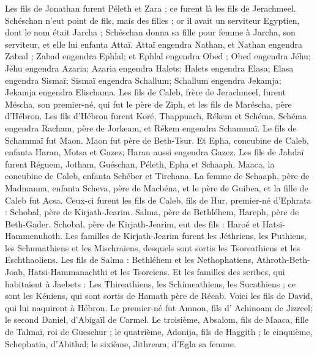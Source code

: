 \begin{multicols}{2}
Les fils de Jonathan furent Péleth et Zara ; ce furent là les fils de Jerachmeel.
Schéschan n'eut point de fils, mais des filles ; or il avait un serviteur Egyptien, dont le nom était Jarcha ;
Schéschan donna sa fille pour femme à Jarcha, son serviteur, et elle lui enfanta Attaï.
Attaï engendra Nathan, et Nathan engendra Zabad ;
Zabad engendra Ephlal; et Ephlal engendra Obed ;
 Obed engendra Jéhu; Jéhu engendra Azaria;
Azaria engendra Halets;  Halets engendra Elasa;
Elasa engendra Sismaï; Sismaï engendra Schallum;
Schallum engendra Jekamja; Jekamja engendra Elischama.
Les fils de Caleb, frère de Jerachmeel, furent Méscha, son premier-né, qui fut le père de Ziph, et les fils de Maréscha, père d'Hébron.
Les fils d'Hébron furent  Koré, Thappuach, Rékem et Schéma.
Schéma engendra Racham, père de Jorkeam, et Rékem engendra Schammaï.
Le fils de Schammaï fut Maon. Maon fut père de Beth-Tsur.
Et Epha, concubine de Caleb, enfanta Haran, Motsa et Gazez; Haran aussi engendra Gazez.
Les fils de Jahdaï furent Réguem, Jotham, Guéschan, Péleth, Epha et Schaaph.
Maaca, la concubine de Caleb, enfanta Schéber et Tirchana.
La femme de Schaaph, père de Madmanna, enfanta Scheva, père de Macbéna, et le père de Guibea, et la fille de Caleb fut Acsa.
Ceux-ci furent les fils de Caleb, fils de Hur, premier-né d'Ephrata : Schobal, père de Kirjath-Jearim.
Salma, père de Bethléhem, Hareph, père de Beth-Gader.
Schobal, père de Kirjath-Jearim, eut des fils : Haroé et Hatsi-Hammenuhoth.
Les familles de Kirjath-Jearim furent les Jéthriens, les Puthiens, les Schumathiens et les Mischraïens, desquels sont sortis les Tsoreathiens et les Eschthaoliens.
Les fils de Salma : Bethléhem et les Nethophatiens, Athroth-Beth-Joab, Hatsi-Hammanachthi et les Tsoreïens.
Et les familles des scribes, qui habitaient à Jaebets : Les Thireathiens, les Schimeathiens, les Sucathiens ; ce sont les Kéniens, qui sont sortis de Hamath père de Récab.
\VerseOne{}Voici les fils de David, qui lui naquirent à Hébron. Le premier-né fut Amnon, fils d' Achinoam de Jizreel; le second Daniel, d'Abigaïl de Carmel.
Le troisième, Absalom, fils de Maaca, fille de Talmaï, roi de Gueschur ; le quatrième, Adonija, fils de Haggith ;
le cinquième, Schephatia, d'Abithal; le sixième, Jithream, d'Egla sa femme.

\end{multicols}
